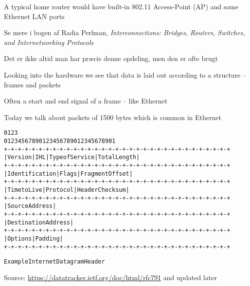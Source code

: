 \documentclass[Screen16to9,17pt]{foils}
\begin{document}
\begin{list1}
\item A typical home router would have built-in 802.11 Access-Point (AP) and some Ethernet LAN ports
\end{list1}




Se mere i bogen af Radia Perlman, \emph{Interconnections: Bridges, Routers, Switches, and Internetworking Protocols}



\centerline{Det er ikke altid man har præcis denne opdeling, men den er ofte brugt}





\begin{list1}
\item Looking into the hardware we see that data is laid out according to a structure -- frames and packets
\item Often a start and end signal of a frame -- like Ethernet
\item Today we talk about packets of 1500 bytes which is common in Ethernet
\end{list1}




\begin{alltt}\footnotesize
    0                   1                   2                   3
    0 1 2 3 4 5 6 7 8 9 0 1 2 3 4 5 6 7 8 9 0 1 2 3 4 5 6 7 8 9 0 1
   +-+-+-+-+-+-+-+-+-+-+-+-+-+-+-+-+-+-+-+-+-+-+-+-+-+-+-+-+-+-+-+-+
   |Version|  IHL  |Type of Service|          Total Length         |
   +-+-+-+-+-+-+-+-+-+-+-+-+-+-+-+-+-+-+-+-+-+-+-+-+-+-+-+-+-+-+-+-+
   |         Identification        |Flags|      Fragment Offset    |
   +-+-+-+-+-+-+-+-+-+-+-+-+-+-+-+-+-+-+-+-+-+-+-+-+-+-+-+-+-+-+-+-+
   |  Time to Live |    Protocol   |         Header Checksum       |
   +-+-+-+-+-+-+-+-+-+-+-+-+-+-+-+-+-+-+-+-+-+-+-+-+-+-+-+-+-+-+-+-+
   |                       Source Address                          |
   +-+-+-+-+-+-+-+-+-+-+-+-+-+-+-+-+-+-+-+-+-+-+-+-+-+-+-+-+-+-+-+-+
   |                    Destination Address                        |
   +-+-+-+-+-+-+-+-+-+-+-+-+-+-+-+-+-+-+-+-+-+-+-+-+-+-+-+-+-+-+-+-+
   |                    Options                    |    Padding    |
   +-+-+-+-+-+-+-+-+-+-+-+-+-+-+-+-+-+-+-+-+-+-+-+-+-+-+-+-+-+-+-+-+

                    Example Internet Datagram Header
\end{alltt}
Source: \url{https://datatracker.ietf.org/doc/html/rfc791} and updated later
\end{document}
